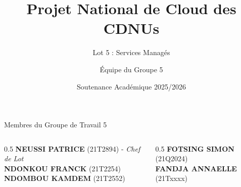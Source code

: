 \documentclass{beamer}
\title[Cloud CDNU - Lot 5]{Projet National de Cloud des CDNUs}
\subtitle{Lot 5 : Services Managés}
\author[Groupe 5]{Équipe du Groupe 5}
\institute[UY1]{Université de Yaoundé I \\ Département d'Informatique}
\date[Mai 2026]{Soutenance Académique 2025/2026}
\begin{document}
\begin{frame}
    \titlepage
    \vspace{-0.3cm}
    \begin{block}{\scriptsize Membres du Groupe de Travail 5}
        \begin{columns}
            \begin{column}{0.5\textwidth}
                \tiny
                \textbf{NEUSSI PATRICE} (21T2894) - \textit{Chef de Lot}\\
                \textbf{NDONKOU FRANCK} (21T2254) \\
                \textbf{NDOMBOU KAMDEM} (21T2552)
            \end{column}
            \begin{column}{0.5\textwidth}
                \tiny
                \textbf{FOTSING SIMON} (21Q2024)\\
                \textbf{FANDJA ANNAELLE} (21Txxxx)
            \end{column}
        \end{columns}
    \end{block}
\end{frame}
\end{document}
